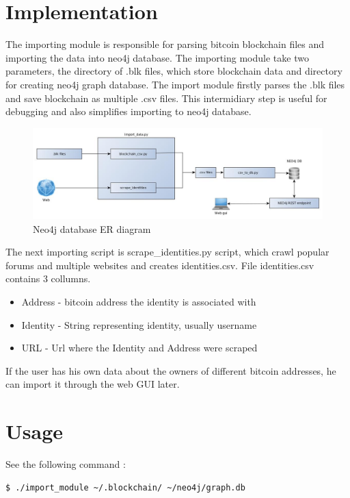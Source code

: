 \documentclass[
  digital, %
  table,   %
  lof,     %
  lot,     %
  oneside
]{fithesis3}
\begin{document}
\section{Implementation}

The importing module is responsible for parsing bitcoin blockchain files and importing the data into neo4j database.
The importing module take two parameters, the directory of .blk files, which store blockchain data and directory for creating neo4j graph database.
The import module firstly parses the .blk files and save blockchain as multiple .csv files. This intermidiary step is useful for debugging and also simplifies importing to neo4j database.

\begin{figure}[!htb]
    \centering
    \includegraphics[width=1\textwidth]{application_architecture}
    \caption{Neo4j database ER diagram}
    \label{application_architecture}
\end{figure}

The next importing script is scrape\_identities.py script, which crawl popular forums and multiple websites and creates identities.csv.
File identities.csv contains 3 collumns.
\begin{itemize}
  \item Address - bitcoin address the identity is associated with
  \item Identity - String representing identity, usually username
  \item URL - Url where the Identity and Address were scraped
\end{itemize}

If the user has his own data about the owners of different bitcoin addresses, he can import it through the web GUI later.


\section{Usage}

\noindent See the following command :
\begin{lstlisting}[language=bash]
  $ ./import_module ~/.blockchain/ ~/neo4j/graph.db
\end{lstlisting}
\end{document}
